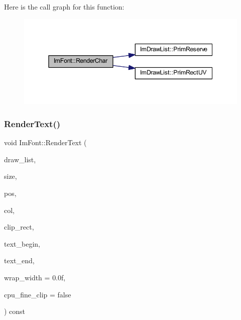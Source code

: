 Here is the call graph for this function\+:
\nopagebreak
\begin{figure}[H]
\begin{center}
\leavevmode
\includegraphics[width=345pt]{struct_im_font_aa8370ddcf8d3e4e034d07de9e00fcdd1_cgraph}
\end{center}
\end{figure}
\mbox{\label{struct_im_font_a2877acf1cfcd964bc2e7fe600a08849e}} 
\subsubsection{\texorpdfstring{Render\+Text()}{RenderText()}}
{\footnotesize\ttfamily void Im\+Font\+::\+Render\+Text (\begin{DoxyParamCaption}\item[{\mbox{\hyperlink{struct_im_draw_list}{Im\+Draw\+List}} $\ast$}]{draw\+\_\+list,  }\item[{float}]{size,  }\item[{\mbox{\hyperlink{struct_im_vec2}{Im\+Vec2}}}]{pos,  }\item[{\mbox{\hyperlink{imgui_8h_a118cff4eeb8d00e7d07ce3d6460eed36}{Im\+U32}}}]{col,  }\item[{const \mbox{\hyperlink{struct_im_vec4}{Im\+Vec4}} \&}]{clip\+\_\+rect,  }\item[{const char $\ast$}]{text\+\_\+begin,  }\item[{const char $\ast$}]{text\+\_\+end,  }\item[{float}]{wrap\+\_\+width = {\ttfamily 0.0f},  }\item[{bool}]{cpu\+\_\+fine\+\_\+clip = {\ttfamily false} }\end{DoxyParamCaption}) const}


